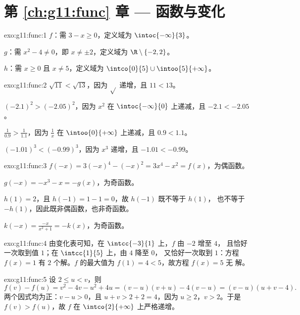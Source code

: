 \section*{第 \ref{ch:g11:func} 章 --- 函数与变化}

\begin{solution}{exo:g11:func:1}
$f$：需 $3 - x \geq 0$，定义域为 $\intoc{-\infty}{3}$。

$g$：需 $x^2 - 4 \neq 0$，即 $x \neq \pm 2$，定义域为
$\R \setminus \{-2, 2\}$。

$h$：需 $x \geq 0$ 且 $x \neq 5$，定义域为
$\intco{0}{5} \cup \intoo{5}{+\infty}$。
\end{solution}

\begin{solution}{exo:g11:func:2}
$\sqrt{11} < \sqrt{13}$，因为 $\sqrt{}$ 递增，且 $11 < 13$。

$(-2.1)^2 > (-2.05)^2$，因为 $x^2$ 在
$\intoc{-\infty}{0}$ 上递减，且 $-2.1 < -2.05$。

$\frac{1}{0.9} > \frac{1}{1.1}$，因为 $\frac1x$ 在
$\intoo{0}{+\infty}$ 上递减，且 $0.9 < 1.1$。

$(-1.01)^3 < (-0.99)^3$，因为 $x^3$ 递增，且 $-1.01 < -0.99$。
\end{solution}

\begin{solution}{exo:g11:func:3}
$f(-x) = 3(-x)^4 - (-x)^2 = 3x^4 - x^2 = f(x)$，为偶函数。

$g(-x) = -x^3 - x = -g(x)$，为奇函数。

$h(1) = 2$，且 $h(-1) = 1 - 1 = 0$，故 $h(-1)$ 既不等于 $h(1)$，
也不等于 $-h(1)$，因此既非偶函数，也非奇函数。

$k(-x) = \frac{-x}{x^2+1} = -k(x)$，为奇函数。
\end{solution}

\begin{solution}{exo:g11:func:4}
由变化表可知，在 $\intcc{-3}{1}$ 上，$f$ 由 $-2$ 增至 $4$，
且恰好一次取到值 $1$；在 $\intcc{1}{5}$ 上，由 $4$ 降至 $0$，
又恰好一次取到 $1$：方程 $f(x) = 1$ 有
$2$ 个解。$f$ 的最大值为 $f(1) = 4 < 5$，故方程 $f(x) = 5$ 无
解。
\end{solution}

\begin{solution}{exo:g11:func:5}
设 $2 \leq u < v$，则
\[
f(v) - f(u) = v^2 - 4v - u^2 + 4u = (v-u)(v+u) - 4(v-u)
= (v - u)(u + v - 4).
\]
两个因式均为正：$v - u > 0$，且 $u + v > 2 + 2 = 4$，因为
$u \geq 2$，$v > 2$。于是 $f(v) > f(u)$，故 $f$ 在
$\intco{2}{+\infty}$ 上严格递增。
\end{solution}

